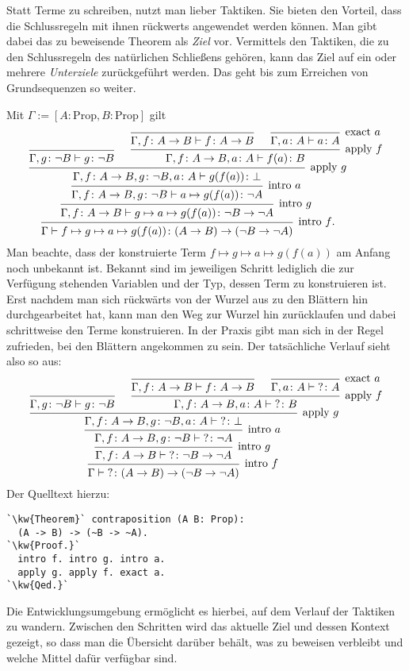 Statt Terme zu schreiben, nutzt man lieber Taktiken. Sie bieten den
Vorteil, dass die Schlussregeln mit ihnen rückwerts angewendet werden
können. Man gibt dabei das zu beweisende Theorem als \emph{Ziel}
vor. Vermittels den Taktiken, die zu den Schlussregeln des natürlichen
Schließens gehören, kann das Ziel auf ein oder mehrere \emph{Unterziele}%
 zurückgeführt werden. Das geht bis zum Erreichen
von Grundsequenzen so weiter.

Mit $\Gamma:=[A\colon\mathrm{Prop},B\colon\mathrm{Prop}]$ gilt
\[\begin{prooftree}
        \infer0{\Gamma,g\colon\lnot B\vdash g\colon\lnot B}
          \infer0{\Gamma,f\colon A\to B\vdash f\colon A\to B}
          \infer0[exact $a$]{\Gamma,a\colon A\vdash a\colon A}
        \infer2[apply $f$]{\Gamma,f\colon A\to B, a\colon A\vdash f(a)\colon B}
      \infer2[apply $g$]{\Gamma, f\colon A\to B, g\colon\lnot B, a\colon A\vdash g(f(a))\colon\bot}
    \infer1[intro $a$]{\Gamma, f\colon A\to B, g\colon\lnot B\vdash a\mapsto g(f(a))\colon \lnot A}
  \infer1[intro $g$]{\Gamma, f\colon A\to B\vdash g\mapsto a\mapsto g(f(a))\colon \lnot B\to\lnot A}
\infer1[intro $f${\normalsize .}]{\Gamma\vdash f\mapsto g\mapsto a\mapsto g(f(a))\colon (A\to B)\to (\lnot B\to\lnot A)}
\end{prooftree}\]
Man beachte, dass der konstruierte Term $f\mapsto g\mapsto a\mapsto g(f(a))$ am Anfang noch
unbekannt ist. Bekannt sind im jeweiligen Schritt lediglich die zur
Verfügung stehenden Variablen und der Typ, dessen Term zu konstruieren
ist. Erst nachdem man sich rückwärts von der Wurzel aus zu den
Blättern hin durchgearbeitet hat, kann man den Weg zur Wurzel hin
zurücklaufen und dabei schrittweise den Terme konstruieren.
In der Praxis gibt man sich in der Regel zufrieden, bei den Blättern
angekommen zu sein. Der tatsächliche Verlauf sieht also so aus:
\[\begin{prooftree}
        \infer0{\Gamma,g\colon\lnot B\vdash g\colon\lnot B}
          \infer0{\Gamma,f\colon A\to B\vdash f\colon A\to B}
          \infer0[exact $a$]{\Gamma,a\colon A\vdash {?}\colon A}
        \infer2[apply $f$]{\Gamma,f\colon A\to B, a\colon A\vdash {?}\colon B}
      \infer2[apply $g$]{\Gamma, f\colon A\to B, g\colon\lnot B, a\colon A\vdash {?}\colon\bot}
    \infer1[intro $a$]{\Gamma, f\colon A\to B, g\colon\lnot B\vdash {?}\colon \lnot A}
  \infer1[intro $g$]{\Gamma, f\colon A\to B\vdash {?}\colon \lnot B\to\lnot A}
\infer1[intro $f$]{\Gamma\vdash {?}\colon (A\to B)\to (\lnot B\to\lnot A)}
\end{prooftree}\]
Der Quelltext hierzu:
\begin{lstlisting}[escapechar=`, xleftmargin=\mathindent]
`\kw{Theorem}` contraposition (A B: Prop):
  (A -> B) -> (~B -> ~A).
`\kw{Proof.}`
  intro f. intro g. intro a.
  apply g. apply f. exact a.
`\kw{Qed.}`
\end{lstlisting}
Die Entwicklungsumgebung ermöglicht es hierbei, auf dem Verlauf der
Taktiken zu wandern. Zwischen den Schritten wird das aktuelle Ziel und
dessen Kontext gezeigt, so dass man die Übersicht darüber behält,
was zu beweisen verbleibt und welche Mittel dafür verfügbar sind.
